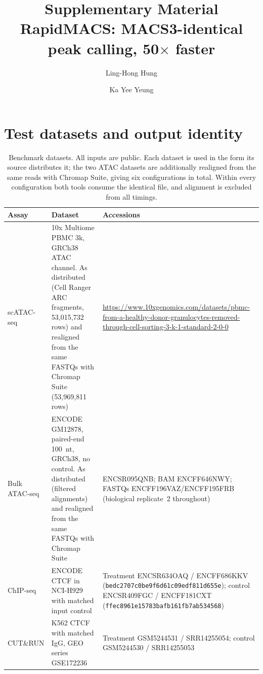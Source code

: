 \documentclass[10pt]{article}
\title{\textbf{Supplementary Material}\\[4pt]
\large RapidMACS: MACS3-identical peak calling, 50$\times$ faster}
\author{Ling-Hong Hung \and Ka Yee Yeung}
\date{}
\begin{document}
\maketitle

\section{Test datasets and output identity}
\begin{table}[h]
\centering
\small
\caption{Benchmark datasets. All inputs are public. Each dataset is used in the form its source distributes it; the two ATAC datasets are additionally realigned from the same reads with Chromap Suite, giving six configurations in total. Within every configuration both tools consume the identical file, and alignment is excluded from all timings.}
\begin{tabular}{@{}p{}p{}p{}@{}}
\toprule
\textbf{Assay} & \textbf{Dataset} & \textbf{Accessions} \\
\midrule
scATAC-seq & 10x Multiome PBMC 3k, GRCh38 ATAC channel. As distributed (Cell Ranger ARC fragments, 53{,}015{,}732 rows) and realigned from the same FASTQs with Chromap Suite (53{,}969{,}811 rows) & \url{https://www.10xgenomics.com/datasets/pbmc-from-a-healthy-donor-granulocytes-removed-through-cell-sorting-3-k-1-standard-2-0-0} \\
\addlinespace
Bulk ATAC-seq & ENCODE GM12878, paired-end 100~nt, GRCh38, no control. As distributed (filtered alignments) and realigned from the same FASTQs with Chromap Suite & ENCSR095QNB; BAM ENCFF646NWY; FASTQs ENCFF196VAZ/\allowbreak ENCFF195FRB (biological replicate~2 throughout) \\
\addlinespace
ChIP-seq & ENCODE CTCF in NCI-H929 with matched input control & Treatment ENCSR634OAQ / ENCFF686KKV (\texttt{bedc2707\allowbreak c0be9f6d\allowbreak 61c09edf\allowbreak 811d655e}); control ENCSR409FGC / ENCFF181CXT (\texttt{ffec8961\allowbreak e15783ba\allowbreak fb161fb7\allowbreak ab534568}) \\
\addlinespace
CUT\&RUN & K562 CTCF with matched IgG, GEO series GSE172236 & Treatment GSM5244531 / SRR14255054; control GSM5244530 / SRR14255053 \\
\bottomrule
\end{tabular}
\end{table}
\end{document}
